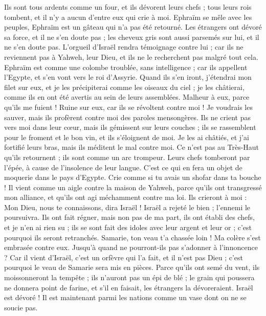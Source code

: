 \begin{multicols}{2}
Ils sont tous ardents comme un four, et ils dévorent leurs chefs ; tous leurs rois tombent, et il n'y a aucun d'entre eux qui crie à moi.
Ephraïm se mêle avec les peuples, Ephraïm est un gâteau qui n'a pas été retourné.
Les étrangers ont dévoré sa force, et il ne s'en doute pas ; les cheveux gris sont aussi parsemés sur lui, et il ne s'en doute pas.
L'orgueil d'Israël rendra témoignage contre lui ; car ils ne reviennent pas à Yahweh, leur Dieu, et ils ne le recherchent pas malgré tout cela. 
Ephraïm est comme une colombe troublée, sans intelligence ; car ils appellent l'Egypte, et s'en vont vers le roi d'Assyrie.
Quand ils s'en iront, j'étendrai mon filet sur eux, et je les précipiterai comme les oiseaux du ciel ; je les châtierai, comme ils en ont été avertis au sein de leurs assemblées.
Malheur à eux, parce qu'ils me fuient ! Ruine sur eux, car ils se révoltent contre moi ! Je voudrais les sauver, mais ils profèrent contre moi des paroles mensongères.
Ils ne crient pas vers moi dans leur cœur, mais ils gémissent sur leurs couches ; ils se rassemblent pour le froment et le bon vin, et ils s'éloignent de moi.
Je les ai châtiés, et j'ai fortifié leurs bras, mais ils méditent le mal contre moi.
Ce n'est pas au Très-Haut qu'ils retournent ; ils sont comme un arc trompeur. Leurs chefs tomberont par l'épée, à cause de l'insolence de leur langue. C'est ce qui en fera un objet de moquerie dans le pays d'Egypte.
\VerseOne{}Crie comme si tu avais un shofar dans ta bouche ! Il vient comme un aigle contre la maison de Yahweh, parce qu'ils ont transgressé mon alliance, et qu'ils ont agi méchamment contre ma loi.
Ils crieront à moi : Mon Dieu, nous te connaissons, dira Israël !
Israël a rejeté le bien ; l'ennemi le poursuivra.
Ils ont fait régner, mais non pas de ma part, ils ont établi des chefs, et je n'en ai rien su ; ils se sont fait des idoles avec leur argent et leur or ; c'est pourquoi ils seront retranchés.
Samarie, ton veau t'a chassée loin ! Ma colère s'est embrasée contre eux. Jusqu'à quand ne pourront-ils pas s'adonner à l'innoncence ?
Car il vient d'Israël, c'est un orfèvre qui l'a fait, et il n'est pas Dieu ; c'est pourquoi le veau de Samarie sera mis en pièces.
Parce qu'ils ont semé du vent, ils moissonneront la tempête ; ils n'auront pas un épi de blé ; le grain qui poussera ne donnera point de farine, et s'il en faisait, les étrangers la dévoreraient.
Israël est dévoré ! Il est maintenant parmi les nations comme un vase dont on ne se soucie pas.

\end{multicols}
